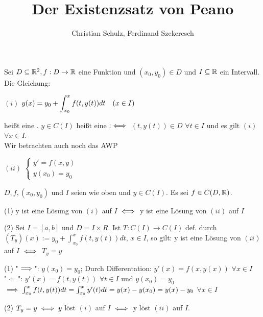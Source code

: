 \documentclass{article}
\title{Der Existenzsatz von Peano}
\author{Christian Schulz, Ferdinand Szekeresch}
\begin{document}
\maketitle

\begin{definition}
Sei $D \subseteq \mathbb{R}^2, f:D \to \mathbb{R}$ eine Funktion und $(x_0, y_0) \in D$ und $I \subseteq \mathbb{R}$ ein Intervall. Die Gleichung:
\begin{liste}
\item[$(i)$] $\displaystyle y(x) = y_0 + \int_{x_0}^{x} f(t,y(t)) dt \quad (x \in I)$
\end{liste} 
\end{definition} 
heißt eine . $y \in C(I)$ heißt eine  $:\iff$ $(t,y(t)) \in D$ $\forall t \in I$ 
und es gilt $(i)$ $\forall x \in I$. \\
Wir betrachten auch noch das AWP 
\begin{liste}
\item[$(ii)$] $\begin{cases} y' = f(x,y) \\ y(x_0) = y_0 \end{cases}$
\end{liste} 

\begin{satz}
$D,f,(x_0,y_0)$ und $I$ seien wie oben und $y \in C(I)$. Es sei $f \in C(D,\mathbb{R}) $.
\begin{liste}
\item[(1)] y ist eine Lösung von $(i)$ auf $I$ $\iff$ y ist eine Lösung von $(ii)$ auf $I$
\item[(2)] Sei $I=[a,b]$ und $D= I \times R$. Ist $T: C(I) \to C(I)$ def. durch $(T_y)(x) := y_0+\int_{x_0}^{x} f(t,y(t)) dt$, $x \in I$, so gilt:
y ist eine Lösung von $(ii)$ auf $I$ $\iff$ $T_y = y$
\end{liste} 
\end{satz}

\begin{beweis}
\begin{liste}
\item[(1)] "$\implies$": $y(x_0) = y_0$; Durch Differentation: $y'(x) = f(x,y(x))$ $\forall x \in I$ \\
"$\Leftarrow$": $y'(x) = f(t,y(t))$ $\forall t \in I$ und $y(x_0) = y_0$ $\implies \int_{x_0}^{x} f(t,y(t)) dt = \int_{x_0}^{x} y'(t) dt = y(x)-y(x_0) = y(x) - y_0$ $\forall x \in I$ 
\item[(2)] $T_y = y \iff y$ löst $(i)$ auf $I$ $\iff$ y löst $(ii)$ auf $I$.
\end{liste} 
\end{beweis}
\end{document}
